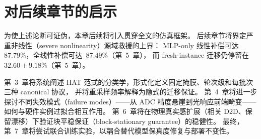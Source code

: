 \section{对后续章节的启示}

为使上述论断可证伪，本章后续将引入贯穿全文的仿真框架。
后续章节将界定严重非线性（severe nonlinearity）源域救援的上界：
MLP-only 线性补偿可达~$87.79\%$，全线性补偿可达~$87.49\%$（第~5~章），
而 fresh-instance 迁移仍停留在~$32.60\pm9.18\%$（第~5~章）。

第~3~章将系统阐述 HAT 范式的分类学，形式化定义固定掩膜、轮次级和每批次三种 canonical 协议，
并将重采样频率解释为隐式的迁移保证。
第~4~章将进一步探讨不同失效模式（failure modes）——从 ADC 精度悬崖到光响应前端畸变——如何与硬件实例过拟合相互作用。
第~6~章将在物理真实感扩展（相关 D2D、保留漂移）下验证块平稳保证（block-stationary guarantee）的稳健性。
最终，第~7~章将尝试联合训练实验，以耦合替代模型保真度修复与部署不变性。

